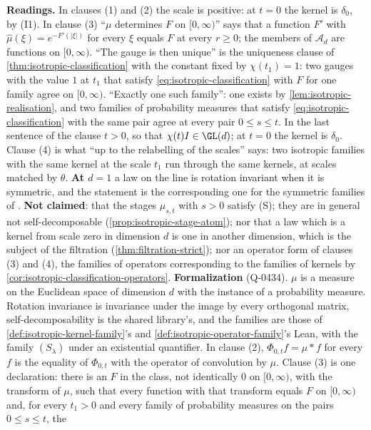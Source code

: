 \begin{theorem}
{\textbf{Readings.} In clauses (1) and (2) the scale is positive: at $t = 0$ the kernel is
$\delta_0$, by (I1). In clause (3) ``$\mu$ determines $F$ on $[0,\infty)$'' says that a function
$F'$ with $\widehat\mu(\xi) = e^{-F'(|\xi|)}$ for every $\xi$ equals $F$ at every $r \ge 0$; the
members of $\mathcal{A}_d$ are functions on $[0,\infty)$. ``The gauge is then unique'' is the
uniqueness clause of \ref{thm:isotropic-classification} with the constant fixed by
$\chi(t_1) = 1$: two gauges with the value $1$ at $t_1$ that satisfy
\ref{eq:isotropic-classification} with $F$ for one family agree on $[0,\infty)$. ``Exactly one
such family'': one exists by \ref{lem:isotropic-realisation}, and two families of probability
measures that satisfy \ref{eq:isotropic-classification} with the same pair agree at every pair
$0 \le s \le t$. In the last sentence of the clause $t > 0$, so that $\chi(t)I \in \GL(d)$; at
$t = 0$ the kernel is $\delta_0$. Clause (4) is what ``up to the relabelling of the scales'' says: two
isotropic families with the same kernel at the scale $t_1$ run through the same kernels, at
scales matched by $\theta$.
\textbf{At $d = 1$} a law on the line is rotation invariant when it is symmetric, and the
statement is the corresponding one for the symmetric families of
. \textbf{Not claimed}: that the stages
$\mu_{s,t}$ with $s > 0$ satisfy (S); they are in general not self-decomposable
(\ref{prop:isotropic-stage-atom}); nor that a law which is a kernel from scale zero in dimension
$d$ is one in another dimension, which is the subject of the filtration
(\ref{thm:filtration-strict}); nor an operator form of clauses (3) and (4), the families of operators
corresponding to the families of kernels by \ref{cor:isotropic-classification-operators}.
\textbf{Formalization} (Q-0434). $\mu$ is a measure on the Euclidean space of dimension $d$
with the instance of a probability measure. Rotation invariance is invariance under the image by
every orthogonal matrix, self-decomposability is the shared library's, and the families are those
of \ref{def:isotropic-kernel-family}'s and \ref{def:isotropic-operator-family}'s Lean, with the
family $(S_\lambda)$ under an existential quantifier. In clause (2), $\Phi_{0,t}f = \mu * f$ for
every $f$ is the equality of $\Phi_{0,t}$ with the operator of convolution by $\mu$. Clause (3) is
one declaration: there is an $F$ in the class, not identically $0$ on $[0,\infty)$, with the
transform of $\mu$, such that every function with that transform equals $F$ on $[0,\infty)$ and,
for every $t_1 > 0$ and every family of probability measures on the pairs $0 \le s \le t$, the
}
\end{theorem}
